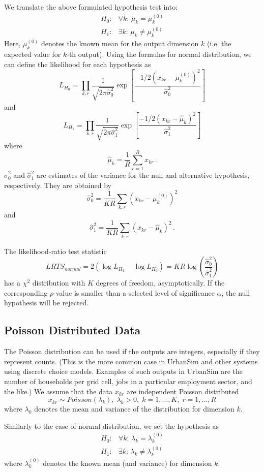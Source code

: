 \documentclass{sig-alternate}
\begin{document}
We translate the above formulated hypothesis test into:
\[
\begin{array}{lc}
H_0: & \forall k: \, \mu_{k} = \mu_{k}^{(0)}\\
H_1: & \exists k: \, \mu_{k} \not= \mu_{k}^{(0)}
\end{array}
\]
Here, $\mu_{k}^{(0)}$ denotes the known mean for the output dimension $k$
(i.e. the expected value for $k$-th output). Using the formulas for normal distribution,
we can define the likelihood for each hypothesis as
\[
L_{H_0} = \prod_{k,r}\frac{1}{\sqrt{2\pi\hat{\sigma}_0^2}} \exp\left[ \frac{-1/2(x_{kr}-\mu_{k}^{(0)})^2}{\hat{\sigma}_0^2}\right]
\]
and
\[
L_{H_1} = \prod_{k,r}\frac{1}{\sqrt{2\pi\hat{\sigma}_1^2}} \exp\left[
  \frac{-1/2(x_{kr}-\hat{\mu}_{k})^2}{\hat{\sigma}_1^2}\right]
\]
where
\[
\hat{\mu}_{k} = \frac{1}{R}\sum_{r=1}^R x_{kr}\,.
\]
$\hat{\sigma}_0^2$ and $\hat{\sigma}_1^2$ are estimates of the
variance for the null and alternative hypothesis, respectively. They are
obtained by
\[
\hat{\sigma}_0^2 = \frac{1}{KR}\sum_{k,r}(x_{kr}-\mu_{k}^{(0)})^2
\]
and
\[
\hat{\sigma}_1^2 = \frac{1}{KR}\sum_{k,r}(x_{kr}-\hat{\mu}_{k})^2\,.
\]

The likelihood-ratio test statistic
\[
LRTS_{normal} = 2(\log L_{H_1} - \log L_{H_0}) = KR
\log\left(\frac{\hat{\sigma}_0^2}{\hat{\sigma}_1^2}\right)
\]
has a $\chi^2$ distribution with $K$
degrees of freedom, asymptotically. If the corresponding $p$-value is smaller than a selected level
of significance $\alpha$, the null hypothesis
will be rejected.

%
\subsection{Poisson Distributed Data}
\label{sec:poisson}
%
The Poisson distribution can be used if the outputs are integers,
especially if they represent counts.  (This is the more common case in
UrbanSim and other systems using discrete choice models.  Examples of such
outputs in UrbanSim are the number of households per grid cell, jobs in a
particular employment sector, and the like.)  We assume that the data $x_{kr}$
are independent Poisson distributed
\[
x_{kr} \sim Poisson(\lambda_k),\; \lambda_k>0, \; k=1,\dots, K,\; r=1,\dots,R
\]
where $\lambda_k$ denotes the mean and variance of the distribution for
dimension $k$.

Similarly to the case of normal distribution, we set the hypothesis as
\[
\begin{array}{lc}
H_0: & \forall k: \, \lambda_{k} = \lambda_{k}^{(0)}\\
H_1: & \exists k: \, \lambda_{k} \not= \lambda_{k}^{(0)}
\end{array}
\]
where $\lambda_{k}^{(0)}$ denotes the known mean (and variance)
for dimension $k$.
\end{document}
